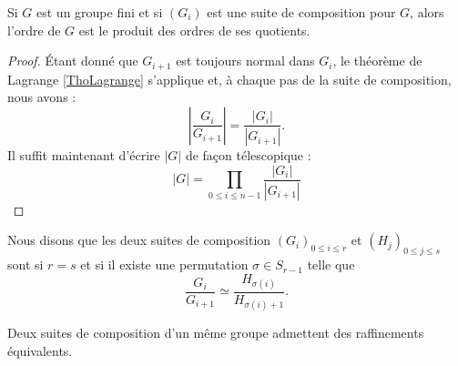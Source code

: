 \begin{proposition}     \label{PROPooUIXNooJdKuAs}
	Si \( G\) est un groupe fini et si \( (G_i)\) est une suite de composition pour \( G\), alors l'ordre de \( G\) est le produit des ordres de ses quotients.
\end{proposition}

\begin{proof}
	Étant donné que \( G_{i+1}\) est toujours normal dans \( G_i\), le théorème de Lagrange \ref{ThoLagrange} s'applique et, à chaque pas de la suite de composition, nous avons :
	\begin{equation}
		\left| \frac{ G_i }{ G_{i+1} } \right| = \frac{ | G_i | }{ | G_{i+1} | }.
	\end{equation}
	Il suffit maintenant d'écrire \( | G |\) de façon télescopique :
	\begin{equation}
		| G |=\prod_{0\leq i\leq n-1}\frac{ | G_i | }{ | G_{i+1} | }
	\end{equation}
\end{proof}

\begin{definition}      \label{DEFooSZZSooCrgDyo}
	Nous disons que les deux suites de composition \( (G_i)_{0\leq i\leq r}\) et \( (H_j)_{0\leq j\leq s}\) sont  si \( r=s\) et si il existe une permutation \( \sigma\in S_{r-1}\) telle que
	\begin{equation}
		\frac{ G_i }{ G_{i+1} }\simeq\frac{ H_{\sigma(i)} }{ H_{\sigma(i)+1} }.
	\end{equation}
\end{definition}

\begin{proposition}[Schreider]
	Deux suites de composition d'un même groupe admettent des raffinements équivalents.
\end{proposition}


